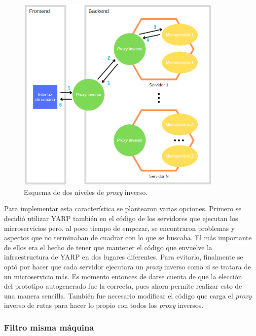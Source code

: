 \documentclass[11pt,spanish,listoffigures]{tfgetsinf}
\begin{document}
\begin{figure}[ht]
\centering
\includegraphics[width=0.9\textwidth]{imagenes/esquemaProxyInversoDoble}
\caption{Esquema de dos niveles de \emph{proxy} inverso.}
	\label{esquemaProxyInversoDoble}
\end{figure}

Para implementar esta característica se plantearon varias opciones. Primero se decidió utilizar YARP también en el código de los servidores que ejecutan los microservicios pero, al poco tiempo de empezar, se encontraron problemas y aspectos que no terminaban de cuadrar con lo que se buscaba. El más importante de ellos era el hecho de tener que mantener el código que envuelve la infraestructura de YARP en dos lugares diferentes. Para evitarlo, finalmente se optó por hacer que cada servidor ejecutara un \emph{proxy} inverso como si se tratara de un microservicio más. Es momento entonces de darse cuenta de que la elección del prototipo autogenerado fue la correcta, pues ahora permite realizar esto de una manera sencilla. También fue necesario modificar el código que carga el \emph{proxy} inverso de rutas para hacer lo propio con todos los \emph{proxy} inversos.


			\subsubsection{Filtro misma máquina}
\end{document}
